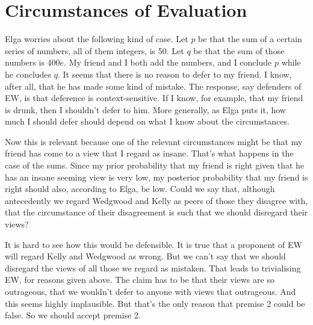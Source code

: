 \section{Circumstances of Evaluation}
Elga worries about the following kind of case. Let $p$ be that the sum of a certain series of numbers, all of them integers, is 50. Let $q$ be that the sum of those numbers is $400e$. My friend and I both add the numbers, and I conclude $p$ while he concludes $q$. It seems that there is no reason to defer to my friend. I know, after all, that he has made some kind of mistake. The response, say defenders of EW, is that deference is context-sensitive. If I know, for example, that my friend is drunk, then I shouldn't defer to him. More generally, as Elga puts it, how much I should defer should depend on what I know about the circumstances.

Now this is relevant because one of the relevant circumstances might be that my friend has come to a view that I regard as insane. That's what happens in the case of the sums. Since my prior probability that my friend is right given that he has an insane seeming view is very low, my posterior probability that my friend is right should also, according to Elga, be low. Could we say that, although antecedently we regard Wedgwood and Kelly as peers of those they disagree with, that the circumstance of their disagreement is such that we should disregard their views?

It is hard to see how this would be defensible. It is true that a proponent of EW will regard Kelly and Wedgwood as wrong. But we can't say that we should disregard the views of all those we regard as mistaken. That leads to trivialising EW, for reasons given above. The claim has to be that their views are so outrageous, that we wouldn't defer to anyone with views that outrageous. And this seems highly implausible. But that's the only reason that premise 2 could be false. So we should accept premise 2.

